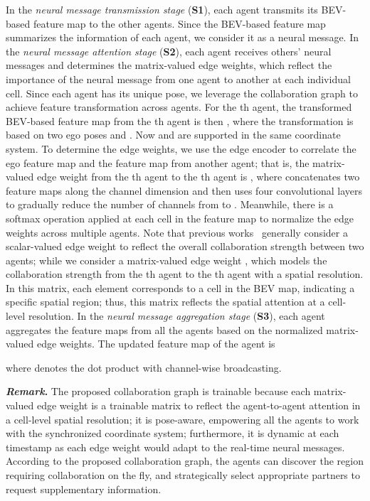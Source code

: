 \documentclass{article}
\begin{document}
In the \textit{neural message transmission stage} (\textbf{S1}), each agent transmits its BEV-based feature map to the other agents. Since the BEV-based feature map summarizes the information of each agent, we consider it as a neural message. In the \textit{neural message attention stage} (\textbf{S2}), each agent receives others' neural messages and determines the matrix-valued edge weights, which reflect the importance of the neural message from one agent to another at each individual cell. Since each agent has its unique pose,  we leverage the collaboration graph to achieve feature transformation across agents. For the th agent, the transformed BEV-based feature map from the th agent is then , where the transformation  is based on two ego poses  and . Now  and  are supported in the same coordinate system. To determine the edge weights, we use the edge encoder  to correlate the ego feature map and the feature map from another agent; that is, the matrix-valued edge weight from the th agent to the th agent is , where   concatenates two feature maps along the channel dimension and then uses four  convolutional layers to gradually reduce the number of channels from  to . Meanwhile, there is a softmax operation applied at each cell in the feature map to normalize the edge weights across multiple agents. Note that previous works~\cite{liu2020when2com,liu2020who2com,wang2020v2vnet} generally consider a scalar-valued edge weight to reflect the overall collaboration strength between two agents; while we consider a matrix-valued edge weight , which models the collaboration strength from the th agent to the th agent with a  spatial resolution. In this matrix, each element corresponds to a cell in the BEV map, indicating a specific spatial region; thus, this matrix reflects the spatial attention at a cell-level resolution. In the \textit{neural message aggregation stage} (\textbf{S3}), each agent aggregates  the feature maps from all the agents based on the normalized matrix-valued edge weights. The updated feature map of the agent  is

where  denotes the dot product with channel-wise broadcasting. 



\textbf{\emph{Remark}.} The proposed collaboration graph is trainable because each matrix-valued edge weight is a trainable matrix to reflect the agent-to-agent attention in a cell-level spatial resolution; it is pose-aware, empowering all the agents to work with the synchronized coordinate system; furthermore, it is dynamic at each timestamp as each edge weight would adapt to the real-time neural messages. According to the proposed collaboration graph, the agents can discover the region requiring collaboration on the fly, and strategically select appropriate partners to request supplementary information.
\end{document}
